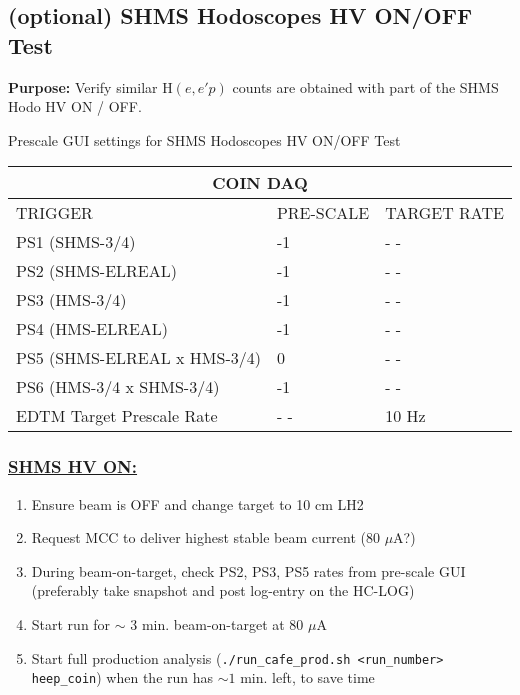 \documentclass{article}
\begin{document}
\subsection{(optional) SHMS Hodoscopes HV ON/OFF Test}
\textbf{Purpose:} Verify similar H$(e,e'p)$ counts are obtained with part of the
SHMS Hodo HV ON / OFF. \\
 \begin{center}
  Prescale GUI settings for SHMS Hodoscopes HV ON/OFF Test
    \begin{tabular}{ |p{6cm}| |p{3cm}| |p{3cm}| }
    \hline
    \multicolumn{3}{|c|}{COIN DAQ} \\
    \hline
    TRIGGER & PRE-SCALE & TARGET RATE\\
    \hline
    PS1 (SHMS-3/4)    & -1  & - - \\
    PS2 (SHMS-ELREAL) & -1  & - - \\
    PS3 (HMS-3/4)     & -1  & - -\\
    PS4 (HMS-ELREAL)  & -1  & - - \\
    PS5 (SHMS-ELREAL x HMS-3/4)  & 0 & - -  \\
    PS6 (HMS-3/4 x SHMS-3/4)     & -1 & - -  \\
    \hline
    EDTM Target Prescale Rate & - - & 10 Hz \\
    \hline
    \end{tabular}
    \end{center}
 \subsubsection*{\underline{SHMS HV ON:}}
 \begin{enumerate}
    \item Ensure beam is OFF and change target to 10 cm LH2
    \item Request MCC to deliver highest stable beam current (80 $\mu$A?)
    \item During beam-on-target, check PS2, PS3, PS5 rates from pre-scale GUI (preferably take snapshot and post log-entry on the HC-LOG)
    \item Start run for $\sim$ 3  min. beam-on-target at 80 $\mu$A 
    \item Start full production analysis (\texttt{./run\_cafe\_prod.sh <run\_number> heep\_coin})
    when the run has $\sim 1$ min. left, to save time
\end{enumerate}
\end{document}
